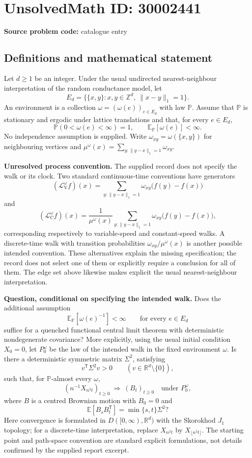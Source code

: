 \documentclass[11pt]{article}
\newcommand{\Z}{\mathbb{Z}}
\newcommand{\R}{\mathbb{R}}
\begin{document}
\section*{UnsolvedMath ID: 30002441}
\textbf{Source problem code:} catalogue entry
\subsection{Definitions and mathematical statement}
Let \(d\geq 1\) be an integer. Under the usual undirected nearest-neighbour interpretation of the random conductance model, let
\[
E_d=\bigl\{\{x,y\}:x,y\in\Z^d,\ \|x-y\|_1=1\bigr\}.
\]
An environment is a collection \(\omega=(\omega(e))_{e\in E_d}\) with law \(\mathbb P\). Assume that \(\mathbb P\) is stationary and ergodic under lattice translations and that, for every \(e\in E_d\),
\[
\mathbb P(0<\omega(e)<\infty)=1,
\qquad \mathbb E_{\mathbb P}[\omega(e)]<\infty.
\]
No independence assumption is supplied. Write \(\omega_{xy}=\omega(\{x,y\})\) for neighbouring vertices and \(\mu^\omega(x)=\sum_{y:\|y-x\|_1=1}\omega_{xy}\).

\textbf{Unresolved process convention.} The supplied record does not specify the walk or its clock. Two standard continuous-time conventions have generators
\[
(\mathcal L_{\mathrm V}^{\omega}f)(x)
 =\sum_{y:\|y-x\|_1=1}\omega_{xy}\bigl(f(y)-f(x)\bigr)
\]
and
\[
(\mathcal L_{\mathrm C}^{\omega}f)(x)
 =\frac{1}{\mu^\omega(x)}\sum_{y:\|y-x\|_1=1}\omega_{xy}\bigl(f(y)-f(x)\bigr),
\]
corresponding respectively to variable-speed and constant-speed walks. A discrete-time walk with transition probabilities \(\omega_{xy}/\mu^\omega(x)\) is another possible intended convention. These alternatives explain the missing specification; the record does not select one of them or explicitly require a conclusion for all of them. The edge set above likewise makes explicit the usual nearest-neighbour interpretation.

\textbf{Question, conditional on specifying the intended walk.} Does the additional assumption
\[
\mathbb E_{\mathbb P}[\omega(e)^{-1}]<\infty
\qquad\text{for every }e\in E_d
\]
suffice for a quenched functional central limit theorem with deterministic nondegenerate covariance? More explicitly, using the usual initial condition \(X_0=0\), let \(P_0^\omega\) be the law of the intended walk in the fixed environment \(\omega\). Is there a deterministic symmetric matrix \(\Sigma^2\), satisfying
\[
v^{\mathsf T}\Sigma^2v>0\qquad(v\in\R^d\setminus\{0\}),
\]
such that, for \(\mathbb P\)-almost every \(\omega\),
\[
\left(n^{-1}X_{n^2t}\right)_{t\geq0}
\ \Longrightarrow\ (B_t)_{t\geq0}
\quad\text{under }P_0^\omega,
\]
where \(B\) is a centred Brownian motion with \(B_0=0\) and
\[
\mathbb E[B_sB_t^{\mathsf T}]=\min\{s,t\}\Sigma^2?
\]
Here convergence is formulated in \(D([0,\infty),\R^d)\) with the Skorokhod \(J_1\) topology; for a discrete-time interpretation, replace \(X_{n^2t}\) by \(X_{\lfloor n^2t\rfloor}\). The starting point and path-space convention are standard explicit formulations, not details confirmed by the supplied report excerpt.
\end{document}
